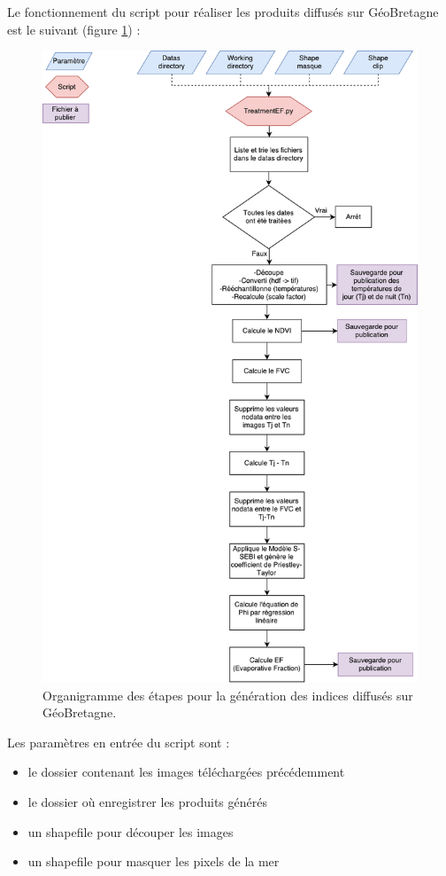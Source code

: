 \documentclass[10pt,a4paper]{article}
\begin{document}
Le fonctionnement du script pour réaliser les produits diffusés sur GéoBretagne est le suivant (figure \ref{orgIndex}) :\newpage

\begin{figure}[!h]
\centering
\includegraphics[scale=0.48]{img/orgIndices.pdf}
\caption{Organigramme des étapes pour la génération des indices diffusés sur GéoBretagne.}
\label{orgIndex}
\end{figure}

Les paramètres en entrée du script sont :

\begin{itemize}
\item le dossier contenant les images téléchargées précédemment
\item le dossier où enregistrer les produits générés
\item un shapefile pour découper les images
\item un shapefile pour masquer les pixels de la mer
\end{itemize}
\end{document}
